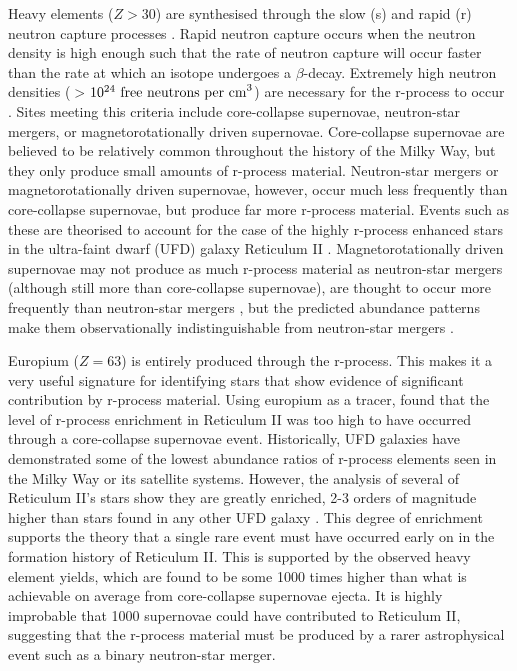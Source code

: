 \documentclass[a4paper,fleqn,usenatbib]{mnras}
\begin{document}
	Heavy elements ($Z > 30$) are synthesised through the slow (s) and rapid (r) neutron capture processes \citep[e.g.,][]{Burbidge1957,Sneden2008}.
	Rapid neutron capture occurs when the neutron density is high enough such that the rate of neutron capture will occur faster than the rate at which an isotope undergoes a $\beta$-decay. Extremely high neutron densities ($>$$10^{24}\ \rm{free\ neutrons\ per\ cm}^{3}$) are necessary for the r-process to occur \citep[e.g.,][]{Burbidge1957,Sneden2008}. Sites meeting this criteria include core-collapse supernovae, neutron-star mergers, or magnetorotationally driven supernovae. Core-collapse supernovae are believed to be relatively common throughout the history of the Milky Way, but they only produce small amounts of r-process material. Neutron-star mergers or magnetorotationally driven supernovae, however, occur much less frequently than core-collapse supernovae, but produce far more r-process material. Events such as these are theorised to account for the case of the highly r-process enhanced stars in the ultra-faint dwarf (UFD) galaxy Reticulum II \citep{Ji2016}.
	Magnetorotationally driven supernovae may not produce as much r-process material as neutron-star mergers (although still more than core-collapse supernovae), are thought to occur more frequently than neutron-star mergers \citep[e.g.,][]{Li2011, LIGO2016}, but the predicted abundance patterns make them observationally indistinguishable from neutron-star mergers \citep{Ji2016}.
	
	Europium ($Z=63$) is entirely produced through the r-process. This makes it a very useful signature for identifying stars that show evidence of significant contribution by r-process material. Using europium as a tracer, \cite{Ji2016} found that the level of r-process enrichment in  Reticulum II was too high to have occurred through a core-collapse supernovae event.
	Historically, UFD galaxies have demonstrated some of the lowest abundance ratios of r-process elements seen in the Milky Way or its satellite systems. However, the analysis of several of Reticulum II's stars show they are greatly enriched, 2-3 orders of magnitude higher than stars found in any other UFD galaxy \citep{Ji2016}. This degree of enrichment supports the theory that a single rare event must have occurred early on in the formation history of Reticulum II. This is supported by the observed heavy element yields, which are found to be some 1000 times higher than what is achievable on average from core-collapse supernovae ejecta. It is highly improbable that 1000 supernovae could have contributed to Reticulum II, suggesting that the r-process material must be produced by a rarer astrophysical event such as a binary neutron-star merger.
	
\end{document}
